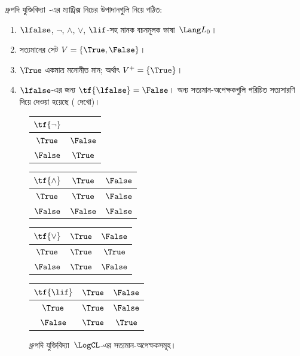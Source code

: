 \documentclass[../../../include/open-logic-section]{subfiles}
\begin{document}
\begin{ex}
ধ্রুপদি যুক্তিবিদ্যা~\LogCL{}-এর ম্যাট্রিক্স নিচের উপাদানগুলি নিয়ে গঠিত:
\begin{enumerate}
  \item $\lfalse$, $\lnot$, $\land$, $\lor$, $\lif$-সহ মানক বচনমূলক
  ভাষা~$\Lang L_0$।
  \item সত্যমানের সেট $V = \{\True, \False\}$।
  \item $\True$ একমাত্র মনোনীত মান; অর্থাৎ $V^+ = \{\True\}$।
  \item $\lfalse$-এর জন্য $\tf{\lfalse} = \False$। অন্য
  সত্যমান-অপেক্ষকগুলি পরিচিত সত্যসারণি দিয়ে দেওয়া হয়েছে
  ( দেখো)।
\end{enumerate}
\begin{figure}
  \begin{center}
      \begin{tabular}{c|c}
        $\tf{\lnot}$ & \\
        \hline
        $\True$ & $\False$ \\
        $\False$ & $\True$
      \end{tabular}
      \quad
      \begin{tabular}{c|cc}
        $\tf{\land}$ & $\True$ & $\False$ \\
        \hline
        $\True$ & $\True$ & $\False$ \\
        $\False$ & $\False$ & $\False$
      \end{tabular}
      \quad
      \begin{tabular}{c|cc}
        $\tf{\lor}$ & $\True$ & $\False$ \\
        \hline
        $\True$ & $\True$ & $\True$ \\
        $\False$ & $\True$ & $\False$
      \end{tabular}
      \quad
      \begin{tabular}{c|cc}
        $\tf{\lif}$ & $\True$ & $\False$ \\
        \hline
        $\True$ & $\True$ & $\False$ \\
        $\False$ & $\True$ & $\True$
      \end{tabular}
    \end{center}
    \caption{ধ্রুপদি যুক্তিবিদ্যা~$\LogCL$-এর সত্যমান-অপেক্ষকসমূহ।}
  \end{figure}
  \end{ex}
\end{document}
